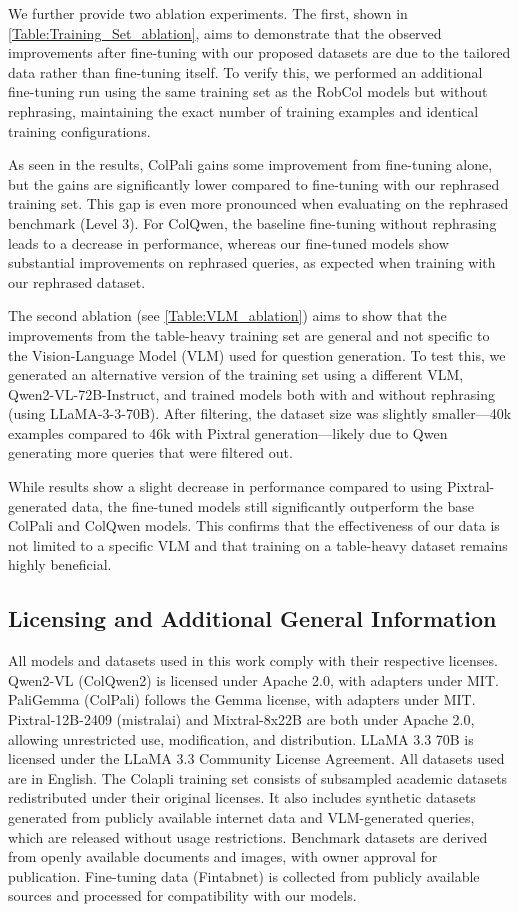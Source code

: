 We further provide two ablation experiments. The first, shown in \cref{Table:Training_Set_ablation}, aims to demonstrate that the observed improvements after fine-tuning with our proposed datasets are due to the tailored data rather than fine-tuning itself. To verify this, we performed an additional fine-tuning run using the same training set as the RobCol models but without rephrasing, maintaining the exact number of training examples and identical training configurations.  

As seen in the results, ColPali gains some improvement from fine-tuning alone, but the gains are significantly lower compared to fine-tuning with our rephrased training set. This gap is even more pronounced when evaluating on the rephrased benchmark (Level 3). For ColQwen, the baseline fine-tuning without rephrasing leads to a decrease in performance, whereas our fine-tuned models show substantial improvements on rephrased queries, as expected when training with our rephrased dataset.  

The second ablation (see \cref{Table:VLM_ablation}) aims to show that the improvements from the table-heavy training set are general and not specific to the Vision-Language Model (VLM) used for question generation. To test this, we generated an alternative version of the training set using a different VLM, Qwen2-VL-72B-Instruct, and trained models both with and without rephrasing (using LLaMA-3-3-70B). After filtering, the dataset size was slightly smaller—40k examples compared to 46k with Pixtral generation—likely due to Qwen generating more queries that were filtered out.  

While results show a slight decrease in performance compared to using Pixtral-generated data, the fine-tuned models still significantly outperform the base ColPali and ColQwen models. This confirms that the effectiveness of our data is not limited to a specific VLM and that training on a table-heavy dataset remains highly beneficial.


\subsection{Licensing and Additional General Information}  

All models and datasets used in this work comply with their respective licenses. Qwen2-VL (ColQwen2) is licensed under Apache 2.0, with adapters under MIT. PaliGemma (ColPali) follows the Gemma license, with adapters under MIT. Pixtral-12B-2409 (mistralai) and Mixtral-8x22B are both under Apache 2.0, allowing unrestricted use, modification, and distribution. LLaMA 3.3 70B is licensed under the LLaMA 3.3 Community License Agreement. All datasets used are in English. The Colapli training set consists of subsampled academic datasets redistributed under their original licenses. It also includes synthetic datasets generated from publicly available internet data and VLM-generated queries, which are released without usage restrictions. Benchmark datasets are derived from openly available documents and images, with owner approval for publication. Fine-tuning data (Fintabnet) is collected from publicly available sources and processed for compatibility with our models.  

